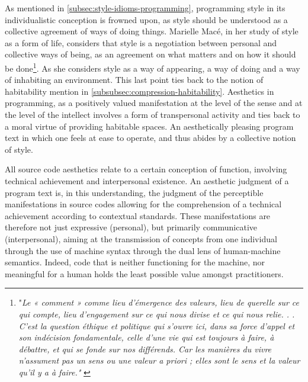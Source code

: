As mentioned in \ref{subsec:style-idioms-programming}, programming style in its individualistic conception is frowned upon, as style should be understood as a collective agreement of ways of doing things. Marielle Macé, in her study of style as a form of life, considers that style is a negotiation between personal and collective ways of being, as an agreement on what matters and on how it should be done\footnote{"\emph{Le « comment » comme lieu d'émergence des valeurs, lieu de querelle sur ce qui compte, lieu d'engagement sur ce qui nous divise et ce qui nous relie. . . C'est la question éthique et politique qui s'ouvre ici, dans sa force d'appel et son indécision fondamentale, celle d'une vie qui est toujours à faire, à débattre, et qui se fonde sur nos différends. Car les manières du vivre n'assument pas un sens ou une valeur a priori ; elles sont le sens et la valeur qu'il y a à faire."} \citep{mace_styles_2016}}. As she considers style as a way of appearing, a way of doing and a way of inhabiting an environment. This last point ties back to the notion of habitability mention in \ref{subsubsec:compression-habitability}. Aesthetics in programming, as a positively valued manifestation at the level of the sense and at the level of the intellect involves a form of transpersonal activity and ties back to a moral virtue of providing habitable spaces. An aesthetically pleasing program text in which one feels at ease to operate, and thus abides by a collective notion of style.

\spacersmall

All source code aesthetics relate to a certain conception of function, involving technical achievement and interpersonal existence. An aesthetic judgment of a program text is, in this understanding, the judgment of the perceptible manifestations in source codes allowing for the comprehension of a technical achievement according to contextual standards. These manifestations are therefore not just expressive (personal), but primarily communicative (interpersonal), aiming at the transmission of concepts from one individual through the use of machine syntax through the dual lens of human-machine semantics. Indeed, code that is neither functioning for the machine, nor meaningful for a human holds the least possible value amongst practitioners.

